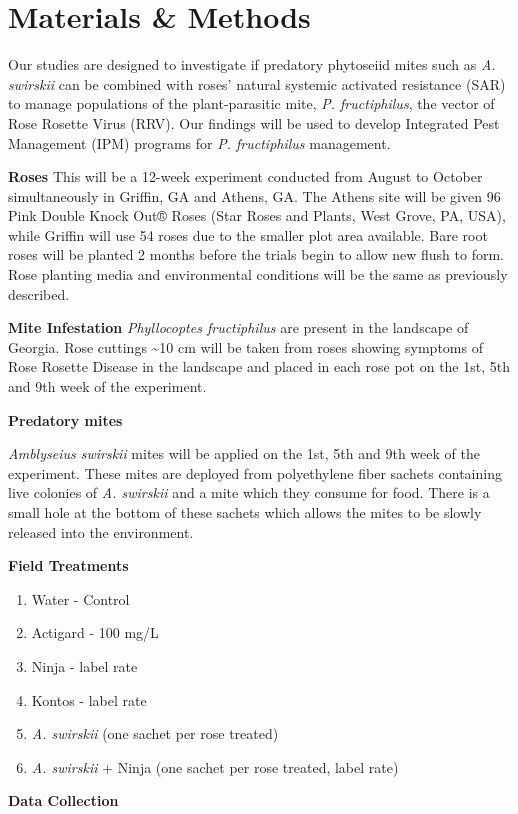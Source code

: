 \documentclass[12pt,final,CPage]{ufthesis}
\begin{document}
{  \hypertarget{materials-methods}{%
  \section{Materials \& Methods}\label{materials-methods}}

  Our studies are designed to investigate if predatory phytoseiid mites such as \emph{A. swirskii} can be combined with roses' natural systemic activated resistance (SAR) to manage populations of the plant-parasitic mite, \emph{P. fructiphilus}, the vector of Rose Rosette Virus (RRV). Our findings will be used to develop Integrated Pest Management (IPM) programs for \emph{P. fructiphilus} management.

  \textbf{Roses}
  This will be a 12-week experiment conducted from August to October simultaneously in Griffin, GA and Athens, GA.
  The Athens site will be given 96 Pink Double Knock Out® Roses (Star Roses and Plants, West Grove, PA, USA), while Griffin will use 54 roses due to the smaller plot area available. Bare root roses will be planted 2 months before the trials begin to allow new flush to form. Rose planting media and environmental conditions will be the same as previously described.

  \textbf{Mite Infestation}
  \emph{Phyllocoptes fructiphilus} are present in the landscape of Georgia. Rose cuttings \textasciitilde10 cm will be taken from roses showing symptoms of Rose Rosette Disease in the landscape and placed in each rose pot on the 1st, 5th and 9th week of the experiment.

  \textbf{Predatory mites}

  \emph{Amblyseius swirskii} mites will be applied on the 1st, 5th and 9th week of the experiment. These mites are deployed from polyethylene fiber sachets containing live colonies of \emph{A. swirskii} and a mite which they consume for food. There is a small hole at the bottom of these sachets which allows the mites to be slowly released into the environment.

  \textbf{Field Treatments}
  \begin{enumerate}
  \def\labelenumi{\arabic{enumi}.}
  \tightlist
  \item
    Water - Control
  \item
    Actigard - 100 mg/L
  \item
    Ninja - label rate
  \item
    Kontos - label rate
  \item
    \emph{A. swirskii} (one sachet per rose treated)
  \item
    \emph{A. swirskii} + Ninja (one sachet per rose treated, label rate)
  \end{enumerate}
  \textbf{Data Collection}

}
\end{document}
